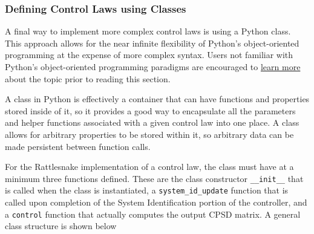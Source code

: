 \documentclass[pdf,12pt,report]{SANDreport}
\newcommand{\inlineCode}{\lstinline[basicstyle=\bfseries\ttfamily]}
\begin{document}
    \subsubsection{Defining Control Laws using Classes}
    
    A final way to implement more complex control laws is using a Python class.  This approach allows for the near infinite flexibility of Python's object-oriented programming at the expense of more complex syntax.  Users not familiar with Python's object-oriented programming paradigms are encouraged to \href{https://docs.python.org/3/tutorial/classes.html}{learn more} about the topic prior to reading this section.
    
    A class in Python is effectively a container that can have functions and properties stored inside of it, so it provides a good way to encapsulate all the parameters and helper functions associated with a given control law into one place.  A class allows for arbitrary properties to be stored within it, so arbitrary data can be made persistent between function calls.
    
    For the Rattlesnake implementation of a control law, the class must have at a minimum three functions defined.  These are the class constructor \inlineCode{__init__} that is called when the class is instantiated, a \inlineCode{system_id_update} function that is called upon completion of the System Identification portion of the controller, and a \inlineCode{control} function that actually computes the output \ac{CPSD} matrix.  A general class structure is shown below
    
\end{document}
